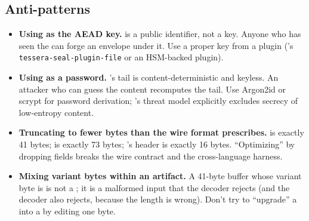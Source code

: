 \subsection{Anti-patterns}

\begin{itemize}
\item \textbf{Using \tesseraid{} as the AEAD key.} \tesseraid{} is a public identifier, not a key. Anyone who has seen the \tesseraid{} can forge an envelope under it. Use a proper key from a plugin (\tesseraseal{}'s \texttt{tessera-seal-plugin-file} or an HSM-backed plugin).
\item \textbf{Using \tesserahash{} as a password.} \tesserahash{}'s tail is content-deterministic and keyless. An attacker who can guess the content recomputes the tail. Use Argon2id \citep{rfc9106} or scrypt for password derivation; \tesserahash{}'s threat model explicitly excludes secrecy of low-entropy content.
\item \textbf{Truncating to fewer bytes than the wire format prescribes.} \tesseraid{} is exactly 41 bytes; \tesserahash{} is exactly 73 bytes; \tesseraseal{}'s header is exactly 16 bytes. ``Optimizing'' by dropping fields breaks the wire contract and the cross-language harness.
\item \textbf{Mixing variant bytes within an artifact.} A 41-byte buffer whose variant byte is  is not a \tesseraid{}; it is a malformed input that the \tesseraid{} decoder rejects (and the \tesserahash{} decoder also rejects, because the length is wrong). Don't try to ``upgrade'' a \tesseraid{} into a \tesserahash{} by editing one byte.
\end{itemize}
